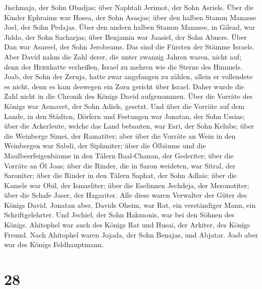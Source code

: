 Jischmaja, der Sohn Obadjas; über Naphtali Jerimot, der Sohn Asriels.
 Über die Kinder Ephraims war Hosea, der Sohn Asasjas;
über den halben Stamm Manasse Joel, der Sohn Pedajas. 
Über den andern halben Stamm Manasse, in Gilead, war Jiddo, der Sohn
Sacharjas; über Benjamin war Jaasiel, der Sohn Abners. 
Über Dan war Asareel, der Sohn Jerobeams. Das sind die Fürsten der
Stämme Israels.  Aber David nahm die Zahl derer, die
unter zwanzig Jahren waren, nicht auf; denn der \textsc{Herr}hatte
verheißen, Israel zu mehren wie die Sterne des Himmels. 
Joab, der Sohn der Zeruja, hatte zwar angefangen zu zählen, allein er
vollendete es nicht, denn es kam deswegen ein Zorn gericht über Israel.
Daher wurde die Zahl nicht in die Chronik des Königs David aufgenommen.
 Über die Vorräte des Königs war Asmavet, der Sohn
Adiels, gesetzt. Und über die Vorräte auf dem Lande, in den Städten,
Dörfern und Festungen war Jonatan, der Sohn Ussias;  über
die Ackerleute, welche das Land bebauten, war Esri, der Sohn Kelubs;
 über die Weinberge Simei, der Ramatiter; aber über die
Vorräte an Wein in den Weinbergen war Sabdi, der Siphmiter;
 über die Ölbäume und die Maulbeerfeigenbäume in den
Tälern Baal-Chanan, der Gederiter; über die Vorräte an Öl Joas;
 über die Rinder, die in Saron weideten, war Sitral, der
Saroniter; über die Rinder in den Tälern Saphat, der Sohn Adlais;
 über die Kamele war Obil, der Ismaeliter; über die
Eselinnen Jechdeja, der Meronotiter;  über die Schafe
Jaser, der Hagariter. Alle diese waren Verwalter der Güter des Königs
David.  Jonatan aber, Davids Oheim, war Rat, ein
verständiger Mann, ein Schriftgelehrter. Und Jechiel, der Sohn Hakmonis,
war bei den Söhnen des Königs.  Ahitophel war auch des
Königs Rat und Husai, der Arkiter, des Königs Freund. 
Nach Ahitophel waren Jojada, der Sohn Benajas, und Abjatar. Joab aber
war des Königs Feldhauptmann.

\hypertarget{section-27}{%
\section{28}\label{section-27}}

